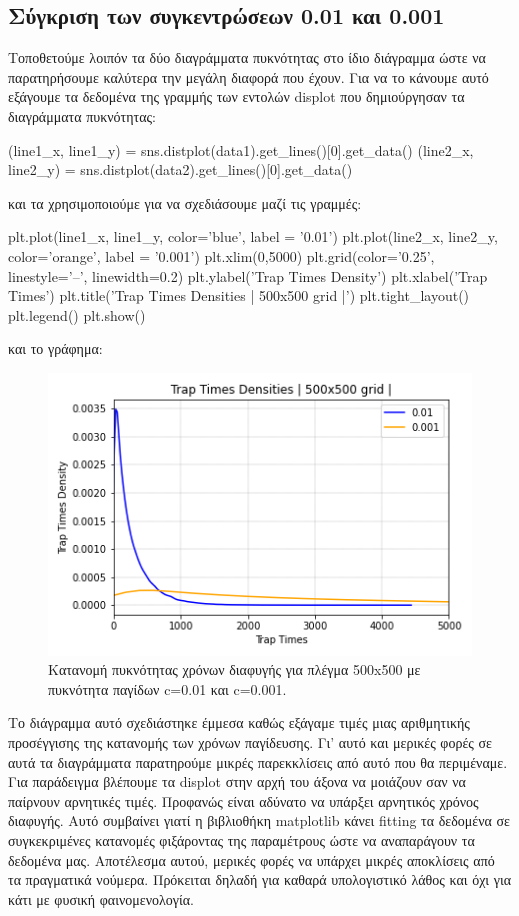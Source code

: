 \subsection{Σύγκριση των συγκεντρώσεων 0.01 και 0.001}
Τοποθετούμε λοιπόν τα δύο διαγράμματα πυκνότητας στο ίδιο διάγραμμα ώστε να παρατηρήσουμε καλύτερα την μεγάλη διαφορά που έχουν. Για να το κάνουμε αυτό εξάγουμε τα δεδομένα της γραμμής των εντολών {\en displot} που δημιούργησαν τα διαγράμματα πυκνότητας:
\en
\begin{python}
(line1_x, line1_y) = sns.distplot(data1).get_lines()[0].get_data()
(line2_x, line2_y) = sns.distplot(data2).get_lines()[0].get_data()
\end{python}
\gr 
και τα χρησιμοποιούμε για να σχεδιάσουμε μαζί τις γραμμές:
\en
\begin{python}
plt.plot(line1_x, line1_y, color='blue', label = '0.01')
plt.plot(line2_x, line2_y, color='orange', label = '0.001')
plt.xlim(0,5000)
plt.grid(color='0.25', linestyle='--', linewidth=0.2)
plt.ylabel('Trap Times Density')
plt.xlabel('Trap Times')
plt.title('Trap Times Densities | 500x500 grid |')
plt.tight_layout()
plt.legend()
plt.show()
\end{python}
\gr 
και το γράφημα:
\begin{figure}[H]
\begin{center}
\includegraphics[scale=1]{figures/TRW_both_dist.png}
\caption{Κατανομή πυκνότητας χρόνων διαφυγής για πλέγμα 500{\en x}500 με πυκνότητα παγίδων {\en c}=0.01 και {\en c}=0.001.}
\label{figuridion3d}
\end{center}
\end{figure}

Το διάγραμμα αυτό σχεδιάστηκε έμμεσα καθώς εξάγαμε τιμές μιας αριθμητικής προσέγγισης της κατανομής των χρόνων παγίδευσης. Γι' αυτό και μερικές φορές σε αυτά τα διαγράμματα παρατηρούμε μικρές παρεκκλίσεις από αυτό που θα περιμέναμε. Για παράδειγμα βλέπουμε τα {\en displot} στην αρχή του άξονα να μοιάζουν σαν να παίρνουν αρνητικές τιμές. Προφανώς είναι αδύνατο να υπάρξει αρνητικός χρόνος διαφυγής. Αυτό συμβαίνει γιατί η βιβλιοθήκη {\en matplotlib} κάνει {\en fitting} τα δεδομένα σε συγκεκριμένες κατανομές φιξάροντας της παραμέτρους ώστε να αναπαράγουν τα δεδομένα μας. Αποτέλεσμα αυτού, μερικές φορές να υπάρχει μικρές αποκλίσεις από τα πραγματικά νούμερα. Πρόκειται δηλαδή για καθαρά υπολογιστικό λάθος και όχι για κάτι με φυσική φαινομενολογία.
